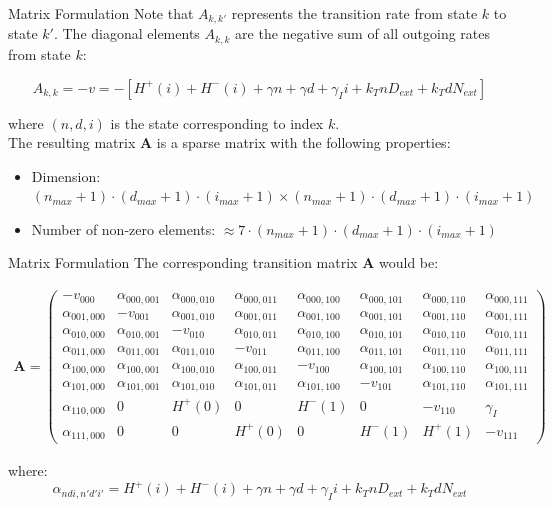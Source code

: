 \documentclass[aspectratio=169]{beamer}
\begin{document}
\begin{frame}{Matrix Formulation}
Note that $A_{k,k'}$ represents the transition rate from state $k$ to state $k'$. The diagonal elements $A_{k,k}$ are the negative sum of all outgoing rates from state $k$:

\[
A_{k,k} = -v=-[H^+(i) + H^-(i) + \gamma n + \gamma d + \gamma_I i + k_T n D_{ext} + k_T d N_{ext}]
\]

where $(n,d,i)$ is the state corresponding to index $k$.\\

The resulting matrix $\mathbf{A}$ is a sparse matrix with the following properties:
\begin{itemize}
    \item Dimension: $(n_{max}+1) \cdot (d_{max}+1) \cdot (i_{max}+1) \times (n_{max}+1) \cdot (d_{max}+1) \cdot (i_{max}+1)$
    \item Number of non-zero elements: $\approx 7 \cdot (n_{max}+1) \cdot (d_{max}+1) \cdot (i_{max}+1)$
\end{itemize}
\end{frame}

\begin{frame}{Matrix Formulation}
The corresponding transition matrix $\mathbf{A}$ would be:

\begin{align*}
\mathbf{A} = 
\begin{pmatrix}
-v_{000} & \alpha_{000,001} & \alpha_{000,010} & \alpha_{000,011} & \alpha_{000,100} & \alpha_{000,101} & \alpha_{000,110} & \alpha_{000,111} \\
\alpha_{001,000} & -v_{001} & \alpha_{001,010} & \alpha_{001,011} & \alpha_{001,100} & \alpha_{001,101} & \alpha_{001,110} & \alpha_{001,111} \\
\alpha_{010,000} & \alpha_{010,001} & -v_{010} & \alpha_{010,011} & \alpha_{010,100} & \alpha_{010,101} & \alpha_{010,110} & \alpha_{010,111} \\
\alpha_{011,000} & \alpha_{011,001} & \alpha_{011,010} & -v_{011} & \alpha_{011,100} & \alpha_{011,101} & \alpha_{011,110} & \alpha_{011,111} \\
\alpha_{100,000} & \alpha_{100,001} & \alpha_{100,010} & \alpha_{100,011} & -v_{100} & \alpha_{100,101} & \alpha_{100,110} & \alpha_{100,111} \\
\alpha_{101,000} & \alpha_{101,001} & \alpha_{101,010} & \alpha_{101,011} & \alpha_{101,100} & -v_{101} & \alpha_{101,110} & \alpha_{101,111} \\
\alpha_{110,000} & 0 & H^+(0) & 0 & H^-(1) & 0 & -v_{110} & \gamma_I \\
\alpha_{111,000} & 0 & 0 & H^+(0) & 0 & H^-(1) & H^+(1) & -v_{111}
\end{pmatrix}
\end{align*}

where:
\[
\alpha_{ndi,n'd'i'} = H^+(i) + H^-(i) + \gamma n + \gamma d + \gamma_I i + k_T n D_{ext} + k_T d N_{ext}
\]

\end{frame}
\end{document}
